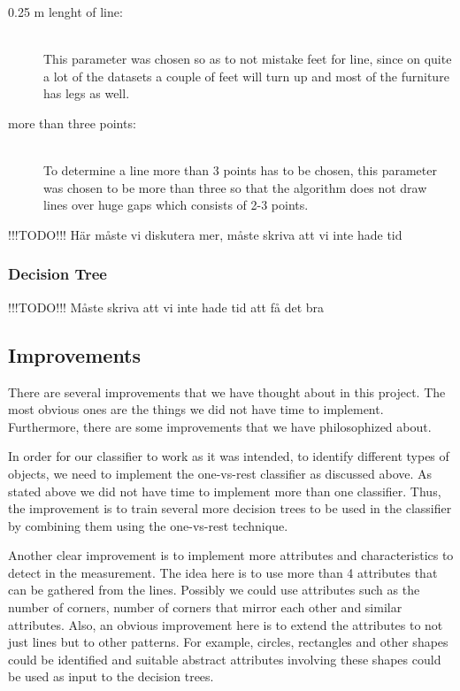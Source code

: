 \documentclass[a4paper, 10pt, conference]{ieeeconf}      %
\begin{document}
\begin{description}
\item[0.25 m lenght of line:] \hfill \\ This parameter was chosen so as to not mistake feet for line, since on quite a lot of the datasets a couple of feet will turn up and most of the furniture has legs as well.
\item[more than three points:] \hfill \\ To determine a line more than 3 points has to be chosen, this parameter was chosen to be more than three so that the algorithm does not draw lines over huge gaps which consists of 2-3 points.
\end{description}

!!!TODO!!! Här måste vi diskutera mer, måste skriva att vi inte hade tid


\subsubsection{Decision Tree}
!!!TODO!!! Måste skriva att vi inte hade tid att få det bra

\subsection{Improvements}
There are several improvements that we have thought about in this project. The most obvious ones are the things we did not have time to implement. Furthermore, there are some improvements that we have philosophized about.

In order for our classifier to work as it was intended, to identify different types of objects, we need to implement the one-vs-rest classifier as discussed above. As stated above we did not have time to implement more than one classifier. Thus, the improvement is to train several more decision trees to be used in the classifier by combining them using the one-vs-rest technique.

Another clear improvement is to implement more attributes and characteristics to detect in the measurement. The idea here is to use more than 4 attributes that can be gathered from the lines. Possibly we could use attributes such as the number of corners, number of corners that mirror each other and similar attributes. Also, an obvious improvement here is to extend the attributes to not just lines but to other patterns. For example, circles, rectangles and other shapes could be identified and suitable abstract attributes involving these shapes could be used as input to the decision trees.
\end{document}
